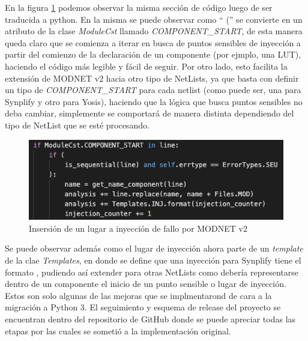 En la figura \ref{modnet_python_1} podemos observar la misma sección de código luego de ser traducida a python. En la misma se puede observar como `` ('' se convierte en un atributo de la clase \textit{ModuleCst} llamado \textit{COMPONENT\_START}, de esta manera queda claro que se comienza a iterar en busca de puntos sensibles de inyección a partir del comienzo de la declaración de un componente (por ejmplo, una LUT), haciendo el código más legible y fácil de seguir. Por otro lado, esto facilita la extensión de MODNET v2 hacia otro tipo de NetLists, ya que basta con definir un tipo de \textit{COMPONENT\_START} para cada netlist (como puede ser, una para Synplify y otro para Yosis), haciendo que la lógica que busca puntos sensibles no deba cambiar, simplemente se comportará de manera distinta dependiendo del tipo de NetList que se esté procesando.

\begin{figure}[H]
	\centering
	\includegraphics[width=0.8 \textwidth]{img/modnet_python_1.png}
	\caption{ Insersión de un lugar a inyección de fallo por MODNET v2}
	\label{modnet_python_1}
\end{figure}

Se puede observar además como el lugar de inyección ahora parte de un \textit{template} de la clae \textit{Templates}, en donde se define que una inyección para Synplify tiene el formato , pudiendo así extender para otras NetLists como debería representarse dentro de un componente el inicio de un punto sensible o lugar de inyección. Estos son solo algunas de las mejoras que se implmentarond de cara a la migración a Python 3. El seguimiento y esquema de release del proyecto se encuentran dentro del repositorio de GitHub donde se puede apreciar todas las etapas por las cuales se sometió a la implementación original.